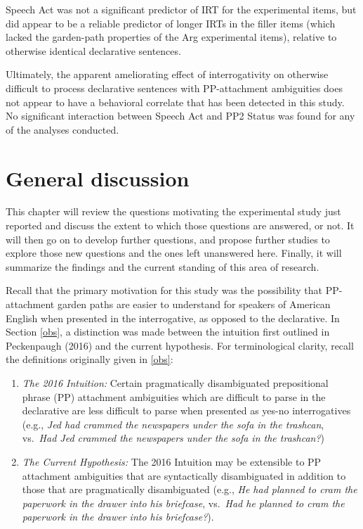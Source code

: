 \documentclass[11pt,oneside]{book}
\begin{document}
Speech Act was not a significant predictor of IRT for the experimental items, but did appear to be a reliable predictor of longer IRTs in the filler items (which lacked the garden-path properties of the Arg experimental items), relative to otherwise identical declarative sentences.

Ultimately, the apparent ameliorating effect of interrogativity on otherwise difficult to process declarative sentences with PP-attachment ambiguities does not appear to have a behavioral correlate that has been detected in this study. No significant interaction between Speech Act and PP2 Status was found for any of the analyses conducted.

\clearpage

\hypertarget{general-discussion}{%
\chapter{General discussion}\label{general-discussion}}

\setlength\parindent{24pt}\setlength{\parskip}{0.0pt plus 1.0pt}

This chapter will review the questions motivating the experimental study just reported and discuss the extent to which those questions are answered, or not. It will then go on to develop further questions, and propose further studies to explore those new questions and the ones left unanswered here. Finally, it will summarize the findings and the current standing of this area of research.

Recall that the primary motivation for this study was the possibility that PP-attachment garden paths are easier to understand for speakers of American English when presented in the interrogative, as opposed to the declarative. In Section \ref{obs}, a distinction was made between the intuition first outlined in Peckenpaugh (2016) and the current hypothesis. For terminological clarity, recall the definitions originally given in \ref{obs}:

\begin{enumerate}
\def\labelenumi{(\arabic{enumi})}
\setcounter{enumi}{44}
\item
  \emph{The 2016 Intuition:} Certain pragmatically disambiguated prepositional phrase (PP) attachment ambiguities which are difficult to parse in the declarative are less difficult to parse when presented as yes-no interrogatives (e.g., \emph{Jed had crammed the newspapers under the sofa in the trashcan}, vs.~\emph{Had Jed crammed the newspapers under the sofa in the trashcan?})
\item
  \emph{The Current Hypothesis:} The 2016 Intuition may be extensible to PP attachment ambiguities that are syntactically disambiguated in addition to those that are pragmatically disambiguated (e.g., \emph{He had planned to cram the paperwork in the drawer into his briefcase}, vs.~\emph{Had he planned to cram the paperwork in the drawer into his briefcase?}).
\end{enumerate}
\end{document}
